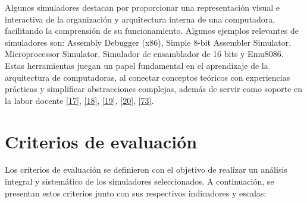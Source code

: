 \documentclass[12pt,oneside]{templates/unerthesis}
\begin{document}
Algunos simuladores destacan por proporcionar una representación visual e interactiva de la organización y arquitectura interna de una computadora, facilitando la comprensión de su funcionamiento. Algunos ejemplos relevantes de simuladores son: Assembly Debugger (x86), Simple 8-bit Assembler Simulator, Microprocessor Simulator, Simulador de ensamblador de 16 bits y Emu8086. Estas herramientas juegan un papel fundamental en el aprendizaje de la arquitectura de computadoras, al conectar conceptos teóricos con experiencias prácticas y simplificar abstracciones complejas, además de servir como soporte en la labor docente \protect\hyperlink{ref-nikolic_survey_2009}{{[}17{]}}, \protect\hyperlink{ref-hasan_survey_2012}{{[}18{]}}, \protect\hyperlink{ref-hennessy2017computer}{{[}19{]}}, \protect\hyperlink{ref-stallings_computer_2021}{{[}20{]}}, \protect\hyperlink{ref-behrooz_computer_2005}{{[}73{]}}.

\hypertarget{criterios-de-evaluaciuxf3n}{%
\section{Criterios de evaluación}\label{criterios-de-evaluaciuxf3n}}

Los criterios de evaluación se definieron con el objetivo de realizar un análisis integral y sistemático de los simuladores seleccionados. A continuación, se presentan estos criterios junto con sus respectivos indicadores y escalas:
\end{document}
